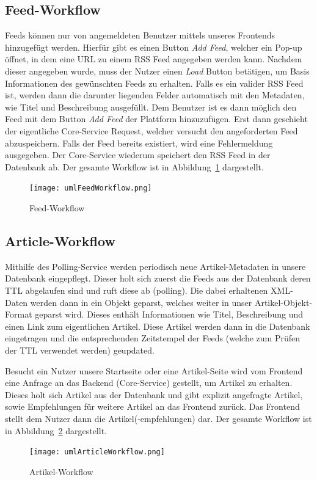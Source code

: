 \subsection{Feed-Workflow}
Feeds können nur von angemeldeten Benutzer mittels unseres Frontends hinzugefügt werden. Hierfür gibt es einen Button \textit{Add Feed}, welcher ein Pop-up öffnet, in dem eine \ac{URL} zu einem \ac{RSS} Feed angegeben werden kann.
Nachdem dieser angegeben wurde, muss der Nutzer einen \textit{Load} Button betätigen, um Basis Informationen des gewünschten Feeds zu erhalten.
Falls es ein valider RSS Feed ist, werden dann die darunter liegenden Felder automatisch mit den Metadaten, wie Titel und Beschreibung ausgefüllt.
Dem Benutzer ist es dann möglich den Feed mit dem Button \textit{Add Feed} der Plattform hinzuzufügen.
Erst dann geschieht der eigentliche Core-Service Request, welcher versucht den angeforderten Feed abzuspeichern. Falls der Feed bereits existiert, wird eine Fehlermeldung ausgegeben.
Der Core-Service wiederum speichert den RSS Feed in der Datenbank ab. Der gesamte Workflow ist in Abbildung~\ref{fig:feedWorkflow} dargestellt.
\begin{figure}[!hbt]
    \texttt{[image: umlFeedWorkflow.png]}
    \caption{Feed-Workflow}
    \label{fig:feedWorkflow}
\end{figure}

\subsection{Article-Workflow}
Mithilfe des Polling-Service werden periodisch neue Artikel-Metadaten in unsere Datenbank eingepflegt. Dieser holt sich zuerst die Feeds aus der Datenbank deren \ac{TTL} abgelaufen sind und ruft diese ab (polling).
Die dabei erhaltenen XML-Daten werden dann in ein Objekt geparst, welches weiter in unser Artikel-Objekt-Format geparst wird. Dieses enthält Informationen wie Titel, Beschreibung und einen Link zum eigentlichen Artikel.
Diese Artikel werden dann in die Datenbank eingetragen und die entsprechenden Zeitstempel der Feeds (welche zum Prüfen der \acs{TTL} verwendet werden) geupdated.

Besucht ein Nutzer unsere Startseite oder eine Artikel-Seite wird vom Frontend eine Anfrage an das Backend (Core-Service) gestellt, um Artikel zu erhalten. Dieses holt sich Artikel aus der Datenbank und gibt explizit
angefragte Artikel, sowie Empfehlungen für weitere Artikel an das Frontend zurück. Das Frontend stellt dem Nutzer dann die Artikel(-empfehlungen) dar. Der gesamte Workflow ist in Abbildung~\ref{fig:articleWorkflow} dargestellt.

\begin{figure}[!hbt]
    \texttt{[image: umlArticleWorkflow.png]}
    \caption{Artikel-Workflow}
    \label{fig:articleWorkflow}
\end{figure}
